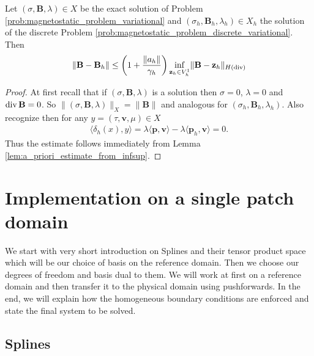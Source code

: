 \documentclass[../master_thesis.tex]{subfiles}
\begin{document}
\begin{theorem}
    Let $(\sigma,\mathbf{B},\lambda) \in X$ be 
    the exact solution of Problem \ref{prob:magnetostatic_problem_variational} 
    and 
    $(\sigma_h,\mathbf{B}_h,\lambda_h) \in X_h$ the solution of the discrete 
    Problem \ref{prob:magnetostatic_problem_discrete_variational}. Then 
    \begin{align*}
        \lVert \mathbf{B} - \mathbf{B}_h \rVert 
        \leq \left( 1 + \frac{\lVert a_h \rVert}{\gamma_h} \right)
            \inf_{\mathbf{z}_h \in V_h^1} \lVert \mathbf{B} - \mathbf{z}_h \rVert _{H(\operatorname{div})} 
    \end{align*}
\end{theorem}
\begin{proof}
    At first recall that if $(\sigma,\mathbf{B},\lambda)$ is a solution then 
    $\sigma = 0$, $\lambda = 0$ and $\operatorname{div} \mathbf{B}=0$. 
    So $\lVert (\sigma,\mathbf{B},\lambda) \rVert _X = \lVert \mathbf{B} \rVert $
    and analogous for $(\sigma_h,\mathbf{B}_h,\lambda_h)$.
    Also recognize then for any $y = (\tau,\mathbf{v}, \mu) \in X$
    \begin{align*}
        \langle \delta_h(x), y \rangle = \lambda \langle \mathbf{p}, \mathbf{v} \rangle 
        - \lambda \langle \mathbf{p}_h, \mathbf{v} \rangle = 0.
    \end{align*}
    Thus the estimate follows immediately from Lemma \ref{lem:a_priori_estimate_from_infsup}.
\end{proof}

\section{Implementation on a single patch domain}

We start with very short introduction on Splines and their tensor product space which 
will be our choice of basis on the reference domain. Then we 
choose our degrees of freedom and basis dual to them. We will work at first 
on a reference domain and then transfer it to the physical domain 
using pushforwards. In the end, we will explain how the homogeneous boundary 
conditions are enforced and state the final system to be solved.

\subsection{Splines}
\end{document}
